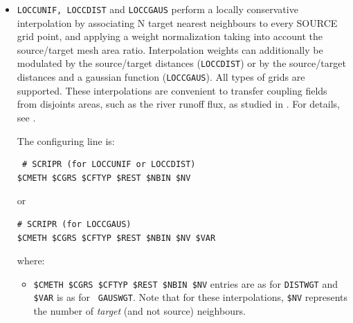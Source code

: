 \begin{itemize}
    The configuring line is:
\begin{verbatim}
 # SCRIPR (for GAUSWGT or GAUSWGTNF)
     $CMETH  $CGRS  $CFTYP  $REST  $NBIN  $NV $VAR
\end{verbatim}
    where all entries are as for {\tt DISTWGT}, except that:
    \begin{itemize}
    \item {\tt \$CMETH = GAUSWGT or GAUSWGTNF}
    \item {\tt \$VAR} defines the weight given to a neighbour source grid
      point as proportional to $exp(-1/2 \cdot d^2/\sigma^2)$ where
      $d$ is the distance between the source and target grid points,
      and $\sigma^2 = \$VAR \cdot \overline{D}^2$ where
      $\overline{D}^2$ is, for each target grid point, the square of average distance between its source grid points  
      (calculated automatically by OASIS3-MCT).
    \end{itemize}

  \item {\tt LOCCUNIF, LOCCDIST} and {\tt LOCCGAUS} perform a
    locally conservative interpolation by associating N target nearest
    neighbours to every SOURCE grid point, and applying a weight
    normalization taking into account the source/target mesh area ratio. Interpolation
    weights can additionally be modulated by the source/target
    distances ({\tt LOCCDIST}) or by the source/target
    distances and a gaussian function ({\tt LOCCGAUS}). All
    types of grids are supported. These interpolations are convenient
    to transfer coupling fields from disjoints areas, such as the
    river runoff flux, as studied in \cite{voldoire2020}. For details, see \cite{maisonna2020}.

    The configuring line is:
\begin{verbatim}
 # SCRIPR (for LOCCUNIF or LOCCDIST)
$CMETH $CGRS $CFTYP $REST $NBIN $NV
\end{verbatim}
    or
 \begin{verbatim}   
# SCRIPR (for LOCCGAUS)
$CMETH $CGRS $CFTYP $REST $NBIN $NV $VAR
\end{verbatim}
    where:
    \begin{itemize}
    \item  {\tt \$CMETH \$CGRS \$CFTYP \$REST \$NBIN \$NV} entries are
      as for {\tt DISTWGT} and  {\tt \$VAR} is as for {\tt
        GAUSWGT}. Note that for these interpolations, {\tt \$NV} represents the number of 
{\it target} (and not source) neighbours. 
    \end{itemize}


\end{itemize}
